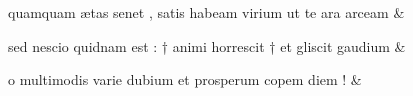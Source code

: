 \documentclass[12pt,onecolumn,twoside,a4paper]{memoir}
\begin{document}
\begin{pairs}
\begin{Leftside}
                              quamquam
                              ætas
                              senet
                              ,
                              satis
                              habeam
                              virium
                              ut
                              te
                              ara
                              arceam \&
                         \stanza {}
                     
                              sed
                              nescio
                              quidnam
                              est
                              :
                              †
                              animi
                              horrescit
                              †
                              et
                              gliscit
                              gaudium \&
                         \stanza {}
                     
                              o
                              multimodis
                              varie
                              dubium
                              et
                              prosperum
                              copem
                              diem
                              ! \&
                     
                  \endnumbering
		\end{Leftside}
                  \begin{Rightside}
			\beginnumbering
			\numberstanzafalse
                     

\end{Rightside}
\end{pairs}
\end{document}
